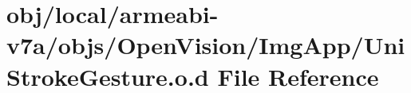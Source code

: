 \hypertarget{v7a_2objs_2_open_vision_2_img_app_2_uni_stroke_gesture_8o_8d}{\section{obj/local/armeabi-\/v7a/objs/\-Open\-Vision/\-Img\-App/\-Uni\-Stroke\-Gesture.o.\-d \-File \-Reference}
\label{v7a_2objs_2_open_vision_2_img_app_2_uni_stroke_gesture_8o_8d}
}
